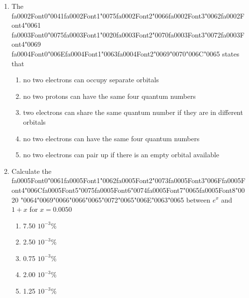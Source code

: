 \documentclass[12pt]{article}
\begin{document}
\begin{enumerate}[label=\arabic*.]
\begin{enumerate}[label=(\alph*)]
    \item SO2
    \item BeCl2
    \item SF6
    \item CBr4
    \item PCl4F
\end{enumerate}
\item The {\csname fa0002Font0\endcsname\char"0041}{\csname fa0002Font1\endcsname\char"0075}{\csname fa0002Font2\endcsname\char"0066}{\csname fa0002Font3\endcsname\char"0062}{\csname fa0002Font4\endcsname\char"0061} {\csname fa0003Font0\endcsname\char"0075}{\csname fa0003Font1\endcsname\char"0020}{\csname fa0003Font2\endcsname\char"0070}{\csname fa0003Font3\endcsname\char"0072}{\csname fa0003Font4\endcsname\char"0069} {\csname fa0004Font0\endcsname\char"006E}{\csname fa0004Font1\endcsname\char"0063}{\csname fa0004Font2\endcsname\char"0069}{\char"0070}{\char"006C}{\char"0065} states that
\begin{enumerate}[label=(\alph*)]
    \item no two electrons can occupy separate orbitals
    \item no two protons can have the same four quantum numbers
    \item two electrons can share the same quantum number if they are in different orbitals
    \item no two electrons can have the same four quantum numbers
    \item no two electrons can pair up if there is an empty orbital available
\end{enumerate}
\item Calculate the {\csname fa0005Font0\endcsname\char"0061}{\csname fa0005Font1\endcsname\char"0062}{\csname fa0005Font2\endcsname\char"0073}{\csname fa0005Font3\endcsname\char"006F}{\csname fa0005Font4\endcsname\char"006C}{\csname fa0005Font5\endcsname\char"0075}{\csname fa0005Font6\endcsname\char"0074}{\csname fa0005Font7\endcsname\char"0065}{\csname fa0005Font8\endcsname\char"0020} {\char"0064}{\char"0069}{\char"0066}{\char"0066}{\char"0065}{\char"0072}{\char"0065}{\char"006E}{\char"0063}{\char"0065} between $e^x$ and $1+x$ for $x=0.0050$
\begin{enumerate}[label=(\alph*)]
    \item 7.50 $10^{-3} \%$
    \item 2.50 $10^{-3} \%$
    \item 0.75 $10^{-3} \%$
    \item 2.00 $10^{-3} \%$
    \item 1.25 $10^{-3} \%$
\end{enumerate}
\end{enumerate}
\end{document}
